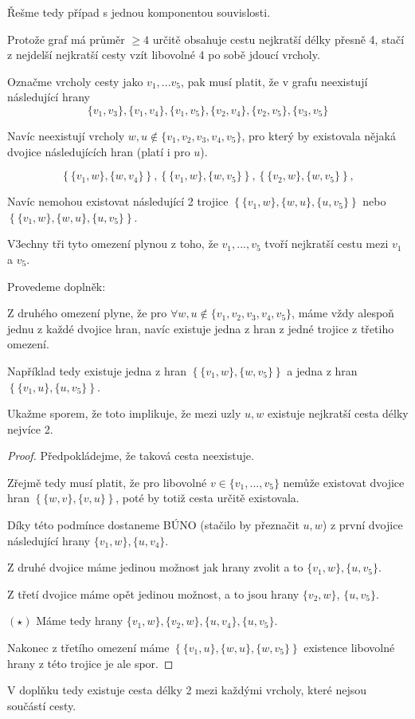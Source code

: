 \documentclass[../main.tex]{subfiles}
\begin{document}
Řešme tedy případ s jednou komponentou souvislosti.

Protože graf má průměr $\geq4$ určitě obsahuje cestu nejkratší délky přesně 4, stačí z nejdelší nejkratší cesty vzít libovolné 4 po sobě jdoucí vrcholy.

Označme vrcholy cesty jako $v_1, ... v_5$, pak musí platit, že v grafu neexistují následující hrany
\begin{equation*}
    \{v_1,v_3\},\{v_1,v_4\},\{v_1,v_5\},\{v_2,v_4\},\{v_2,v_5\},\{v_3,v_5\}
\end{equation*}

Navíc neexistují vrcholy $w,u\notin\{v_1,v_2,v_3,v_4,v_5\}$, pro který by existovala nějaká dvojice následujících hran (platí i pro $u$).

\begin{equation*}    
\left\{\{v_1, w\}, \{w, v_4\}\right\},
\left\{\{v_1, w\}, \{w, v_5\}\right\},
\left\{\{v_2, w\}, \{w, v_5\}\right\},
\end{equation*}

Navíc nemohou existovat následující 2 trojice $\left\{\{v_1, w\}, \{w,u\}, \{u, v_5\}\right\}$ nebo $\left\{\{v_1, w\}, \{w,u\}, \{u, v_5\}\right\}$.

V3echny tři tyto omezení plynou z toho, že $v_1,...,v_5$ tvoří nejkratší cestu mezi $v_1$ a $v_5$.

Provedeme  doplněk:

Z druhého omezení plyne, že pro $\forall w,u \notin \{v_1,v_2,v_3,v_4,v_5\}$,
máme vždy alespoň jednu z každé dvojice hran, navíc existuje jedna z hran z jedné trojice z třetiho omezení. 

Například tedy existuje  jedna z hran $\left\{\{v_1, w\}, \{w, v_5\}\right\}$ a 
jedna z hran $\left\{\{v_1, u\}, \{u, v_5\}\right\}$. 

Ukažme sporem, že toto implikuje, že mezi uzly $u,w$ existuje 
nejkratší cesta délky nejvíce 2.

\begin{proof}
    Předpokládejme, že taková cesta neexistuje.

    Zřejmě tedy musí platit, že pro libovolné $v\in\{v_1,...,v_5\}$ nemůže existovat dvojice hran $\left\{\{w,v\},\{v,u\}\right\}$, poté by totiž cesta určitě existovala.

    Díky této podmínce dostaneme BÚNO (stačilo by přeznačit $u,w$) 
    z první dvojice následující hrany $\{v_1, w\}, \{u, v_4\}$.

    Z druhé dvojice máme jedinou možnost jak hrany zvolit a to $\{v_1, w\}, \{u, v_5\}$.

    Z třetí dvojice máme opět jedinou možnost, a to jsou  hrany $\{v_2, w\}$, $\{u, v_5\}$.

    $(\star)$ Máme tedy hrany $\{v_1, w\}, \{v_2, w\}, \{u, v_4\}, \{u, v_5\}$. 

    Nakonec z třetího omezení máme $\left\{\{v_1, u\}, \{w,u\}, \{w, v_5\}\right\}$
    existence libovolné hrany z této trojice je ale spor.
     
\end{proof}
V doplňku tedy existuje cesta délky 2 mezi každými vrcholy, které nejsou součástí cesty.
\end{document}
